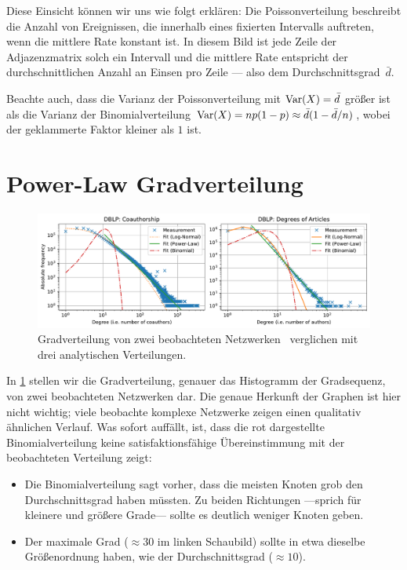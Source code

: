 Diese Einsicht können wir uns wie folgt erklären:
Die Poissonverteilung beschreibt die Anzahl von Ereignissen, die innerhalb eines fixierten Intervalls auftreten, wenn die mittlere Rate konstant ist.
In diesem Bild ist jede Zeile der Adjazenzmatrix solch ein Intervall und die mittlere Rate entspricht der durchschnittlichen Anzahl an Einsen pro Zeile --- also dem Durchschnittsgrad~$\bar d$.

Beachte auch, dass die Varianz der Poissonverteilung mit $\operatorname{Var}(X) = \bar d$ größer ist als die Varianz der Binomialverteilung $\operatorname{Var}(X) = n p(1 - p) \approx \bar d (1 - \bar d / n )$, wobei der geklammerte Faktor kleiner als $1$ ist.

\section{Power-Law Gradverteilung}
\begin{figure}
    \begin{center}
        \includegraphics[width=\textwidth]{data/dblp_degree_distribution.pdf}
    \end{center}
    \caption{Gradverteilung von zwei beobachteten Netzwerken~\cite{Penschuck_2020} verglichen mit drei analytischen Verteilungen.}
    \label{fig:grade_in_dblp}
\end{figure}

In \cref{fig:grade_in_dblp} stellen wir die Gradverteilung, genauer das Histogramm der Gradsequenz, von zwei beobachteten Netzwerken dar.
Die genaue Herkunft der Graphen ist hier nicht wichtig; viele beobachte komplexe Netzwerke zeigen einen qualitativ ähnlichen Verlauf.
Was sofort auffällt, ist, dass die rot dargestellte Binomialverteilung keine satisfaktionsfähige Übereinstimmung mit der beobachteten Verteilung zeigt:

\begin{itemize}
    \item Die  Binomialverteilung sagt vorher, dass die meisten Knoten grob den Durchschnittsgrad haben müssten.
          Zu beiden Richtungen ---sprich für kleinere und größere Grade--- sollte es deutlich weniger Knoten geben.

    \item Der  maximale Grad ($\approx 30$ im linken Schaubild) sollte in etwa dieselbe Größenordnung haben, wie der Durchschnittsgrad ($\approx 10$).
\end{itemize}

